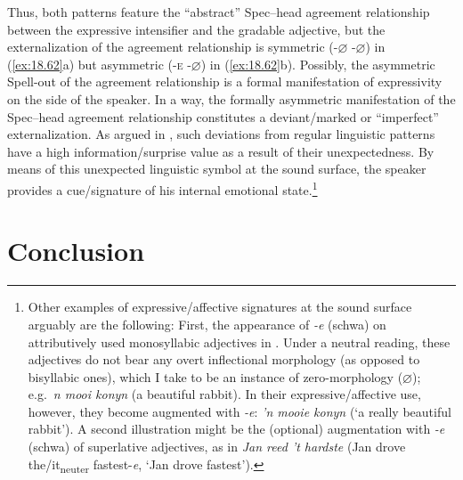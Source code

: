 \documentclass[output=paper]{langsci/langscibook}
\begin{document}
Thus, both patterns feature the \enquote{abstract} Spec--head agreement
relationship between the expressive intensifier and the gradable adjective, but
the externalization of the agreement relationship is symmetric
(-${\varnothing}$ -${\varnothing}$) in (\ref{ex:18.62}a) but asymmetric
(\textsc{-e} -${\varnothing}$) in (\ref{ex:18.62}b). Possibly, the asymmetric
Spell-out of the agreement relationship is a formal manifestation of
expressivity on the side of the speaker. In a way, the formally asymmetric
manifestation of the Spec--head agreement relationship constitutes a
deviant/marked or \enquote{imperfect} externalization. As argued in
\textcite{Corver2013,Corver2016}, such deviations from regular linguistic
patterns have a high information/surprise value as a result of their
unexpectedness. By means of this unexpected linguistic symbol at the sound
surface, the speaker provides a cue/signature of his internal emotional
state.\footnote{Other examples of expressive/affective signatures at the sound
    surface arguably are the following:  First, the appearance of \emph{-e}
    (schwa) on attributively used monosyllabic adjectives in .
    Under a neutral reading, these adjectives do not bear any overt
    inflectional morphology (as opposed to bisyllabic ones), which I take to be
    an instance of zero-morphology ($\varnothing$); e.g.\ \emph{n mooi konyn}
    (a beautiful rabbit). In their expressive/affective use, however, they
    become augmented with \emph{-e}: \emph{'n mooie konyn} (\enquote*{a really
    beautiful rabbit}). A second illustration might be the (optional)
    augmentation with \emph{-e} (schwa) of  superlative adjectives,
as in \emph{Jan reed 't hardste} (Jan drove the/it\textsubscript{neuter}
fastest-\emph{e}, \enquote*{Jan drove fastest}).}

\section{Conclusion}\label{sec:18.9}
\end{document}
